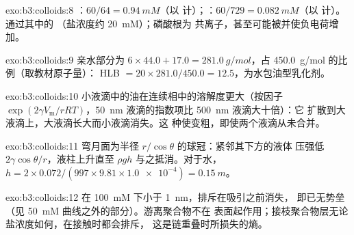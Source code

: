 \begin{solution}{exo:b3:colloids:8}
：$60/64 = \qty{0.94}{mM}$（以  计）；：$60/729 = \qty{0.082}{mM}$（以  计）。
通过其中的  （盐浓度约 \qty{20}{mM}）；磷酸根为
共离子，甚至可能被并使负电荷增加。
\end{solution}

\begin{solution}{exo:b3:colloids:9}
亲水部分为 $6 \times 44.0 + 17.0 = \qty{281.0}{g/mol}$，占 \qty{450.0}{g/mol} 的比例（取教材原子量）：
 HLB $= 20 \times 281.0/450.0 = 12.5$，为水包油型乳化剂。
\end{solution}

\begin{solution}{exo:b3:colloids:10}
小液滴中的油在连续相中的溶解度更大（按因子
$\exp(2\gamma V_{\mathrm m}/rRT)$，\qty{50}{nm} 液滴的指数项比 \qty{500}{nm} 液滴大十倍）：它
扩散到大液滴上，大液滴长大而小液滴消失。这
种使变粗，即使两个液滴从未合并。
\end{solution}

\begin{solution}{exo:b3:colloids:11}
弯月面为半径 $r/\cos\theta$ 的球冠：紧邻其下方的液体
压强低 $2\gamma\cos\theta/r$，液柱上升直至 $\rho gh$ 与之抵消。对于水，
$h = 2 \times 0.072/(997 \times 9.81 \times \num{1.0e-4}) = \qty{0.15}{m}$。
\end{solution}

\begin{solution}{exo:b3:colloids:12}
在 \qty{100}{mM} 下小于 \qty{1}{nm}，排斥在吸引之前消失，
即已无势垒（见 \qty{50}{mM} 曲线之外的部分）。游离聚合物不在
表面起作用；接枝聚合物层无论盐浓度如何，在接触时都会排斥，
这是链重叠时所损失的熵。
\end{solution}

